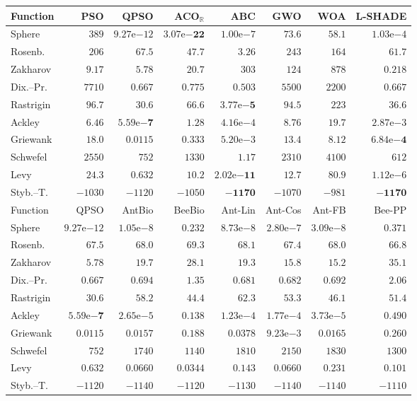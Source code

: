 \begin{tabular}{lrrrrrrr}
\toprule
Function & PSO & QPSO & ACO$_\mathbb{R}$ & ABC & GWO & WOA & L-SHADE \\
\midrule
Sphere & $389$ & $9.27\mathrm{e}{-12}$ & $\mathbf{3.07\mathrm{e}{-22}}$ & $1.00\mathrm{e}{-7}$ & $73.6$ & $58.1$ & $1.03\mathrm{e}{-4}$ \\
Rosenb. & $206$ & $67.5$ & $47.7$ & $\mathbf{3.26}$ & $243$ & $164$ & $61.7$ \\
Zakharov & $9.17$ & $5.78$ & $20.7$ & $303$ & $124$ & $878$ & $\mathbf{0.218}$ \\
Dix.--Pr. & $7710$ & $0.667$ & $0.775$ & $\mathbf{0.503}$ & $5500$ & $2200$ & $0.667$ \\
Rastrigin & $96.7$ & $30.6$ & $66.6$ & $\mathbf{3.77\mathrm{e}{-5}}$ & $94.5$ & $223$ & $36.6$ \\
Ackley & $6.46$ & $\mathbf{5.59\mathrm{e}{-7}}$ & $1.28$ & $4.16\mathrm{e}{-4}$ & $8.76$ & $19.7$ & $2.87\mathrm{e}{-3}$ \\
Griewank & $18.0$ & $0.0115$ & $0.333$ & $5.20\mathrm{e}{-3}$ & $13.4$ & $8.12$ & $\mathbf{6.84\mathrm{e}{-4}}$ \\
Schwefel & $2550$ & $752$ & $1330$ & $\mathbf{1.17}$ & $2310$ & $4100$ & $612$ \\
Levy & $24.3$ & $0.632$ & $10.2$ & $\mathbf{2.02\mathrm{e}{-11}}$ & $12.7$ & $80.9$ & $1.12\mathrm{e}{-6}$ \\
Styb.--T. & $-1030$ & $-1120$ & $-1050$ & $-\mathbf{1170}$ & $-1070$ & $-981$ & $-\mathbf{1170}$ \\
\midrule
Function & QPSO & AntBio & BeeBio & Ant-Lin & Ant-Cos & Ant-FB & Bee-PP \\
\midrule
Sphere & $9.27\mathrm{e}{-12}$ & $1.05\mathrm{e}{-8}$ & $0.232$ & $8.73\mathrm{e}{-8}$ & $2.80\mathrm{e}{-7}$ & $3.09\mathrm{e}{-8}$ & $0.371$ \\
Rosenb. & $67.5$ & $68.0$ & $69.3$ & $68.1$ & $67.4$ & $68.0$ & $66.8$ \\
Zakharov & $5.78$ & $19.7$ & $28.1$ & $19.3$ & $15.8$ & $15.2$ & $35.1$ \\
Dix.--Pr. & $0.667$ & $0.694$ & $1.35$ & $0.681$ & $0.682$ & $0.692$ & $2.06$ \\
Rastrigin & $30.6$ & $58.2$ & $44.4$ & $62.3$ & $53.3$ & $46.1$ & $51.4$ \\
Ackley & $\mathbf{5.59\mathrm{e}{-7}}$ & $2.65\mathrm{e}{-5}$ & $0.138$ & $1.23\mathrm{e}{-4}$ & $1.77\mathrm{e}{-4}$ & $3.73\mathrm{e}{-5}$ & $0.490$ \\
Griewank & $0.0115$ & $0.0157$ & $0.188$ & $0.0378$ & $9.23\mathrm{e}{-3}$ & $0.0165$ & $0.260$ \\
Schwefel & $752$ & $1740$ & $1140$ & $1810$ & $2150$ & $1830$ & $1300$ \\
Levy & $0.632$ & $0.0660$ & $0.0344$ & $0.143$ & $0.0660$ & $0.231$ & $0.101$ \\
Styb.--T. & $-1120$ & $-1140$ & $-1120$ & $-1130$ & $-1140$ & $-1140$ & $-1110$ \\
\bottomrule
\end{tabular}
